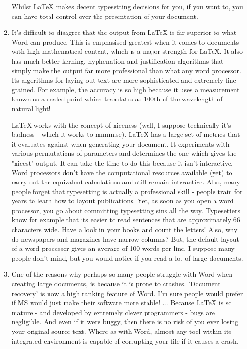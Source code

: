 \documentclass[12pt]{article}
\begin{document}
\begin{enumerate}
        Whilst LaTeX makes decent typesetting decisions for you, if you want to, you can have total control over the presentation of your document.
  \item It's difficult to disagree that the output from LaTeX is far superior to what Word can produce. This is emphasised greatest when it comes to documents with high mathematical content, which is a major strength for LaTeX. It also has much better kerning, hyphenation and justification algorithms that simply make the output far more professional than what any word processor. Its algorithms for laying out text are more sophisticated and extremely fine-grained. For example, the accuracy is so high because it uses a measurement known as a scaled point which translates as 100th of the wavelength of natural light!

        LaTeX works with the concept of niceness (well, I suppose technically it's badness - which it works to minimise). LaTeX has a large set of metrics that it evaluates against when generating your document. It experiments with various permutations of parameters and determines the one which gives the "nicest" output. It can take the time to do this because it isn't interactive. Word processors don't have the computational resources available (yet) to carry out the equivalent calculations and still remain interactive. Also, many people forget that typesetting is actually a professional skill - people train for years to learn how to layout publications. Yet, as soon as you open a word processor, you go about committing typesetting sins all the way. Typesetters know for example that its easier to read sentences that are approximately 66 characters wide. Have a look in your books and count the letters! Also, why do newspapers and magazines have narrow columns? But, the default layout of a word processor gives an average of 100 words per line. I suppose many people don't mind, but you would notice if you read a lot of large documents.
  \item One of the reasons why perhaps so many people struggle with Word when creating large documents, is because it is prone to crashes. 'Document recovery' is now a high ranking feature of Word. I'm sure people would prefer if MS would just make their software more stable! ... Because LaTeX is so mature - and developed by extremely clever programmers - bugs are negligible. And even if it were buggy, then there is no risk of you ever losing your original source text. Where as with Word, almost any tool within its integrated environment is capable of corrupting your file if it causes a crash.

\end{enumerate}
\end{document}
